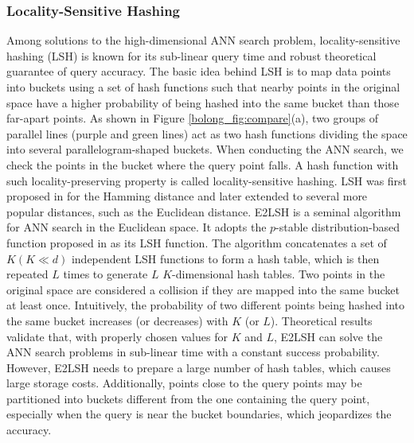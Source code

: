 \documentclass[11pt]{article}
\begin{document}
\subsubsection{Locality-Sensitive Hashing}
Among solutions to the high-dimensional ANN search problem, locality-sensitive hashing (LSH) is known for its sub-linear query time and robust theoretical guarantee of query accuracy. The basic idea behind LSH is to map data points into buckets using a set of hash functions such that nearby points in the original space have a higher probability of being hashed into the same bucket than those far-apart points. 
As shown in Figure \ref{bolong_fig:compare}(a), two groups of parallel lines (purple and green lines) act as two hash functions dividing the space into several parallelogram-shaped buckets. When conducting the ANN search, we check the points in the bucket where the query point falls.
A hash function with such locality-preserving property is called locality-sensitive hashing. LSH was first proposed in \cite{DBLP:conf/stoc/IndykM98,DBLP:conf/vldb/GionisIM99} for the Hamming distance and later extended to several more popular distances, such as the Euclidean distance. E2LSH \cite{e2LSH} is a seminal algorithm for ANN search in the Euclidean space. It adopts the $p$-stable distribution-based function proposed in \cite{DBLP:conf/compgeom/DatarIIM04} as its LSH function. The algorithm concatenates a set of $K (K\ll d)$ independent LSH functions to form a hash table, which is then repeated $L$ times to generate $L$ $K$-dimensional hash tables. Two points in the original space are considered a collision if they are mapped into the same bucket at least once. 
Intuitively, the probability of two different points being hashed into the same bucket increases (or decreases) with $K$ (or $L$). 
Theoretical results validate that, with properly chosen values for $K$ and $L$, E2LSH can solve the ANN search problems in sub-linear time with a constant success probability. However, E2LSH needs to prepare a large number of hash tables, which causes large storage costs. Additionally, points close to the query points may be partitioned into buckets different from the one containing the query point, especially when the query is near the bucket boundaries, which jeopardizes the accuracy.
\end{document}
